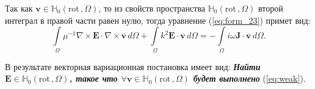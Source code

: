 \documentclass[a4paper,14pt]{article}
\begin{document}
Так как $\mathbf{v} \in \mathbb{H}_{0}( \mathrm{rot}\,, \Omega )$, то из свойств пространства $\mathbb{H}_{0}( \mathrm{rot}\,, \Omega )$ второй интеграл в правой части равен нулю, тогда уравнение (\ref{eq:form_23}) примет вид:
\begin{equation}
	\int\limits_\Omega \mu^{-1} \nabla \times \mathbf{E} \cdot \nabla \times \overline{\mathbf{v}} \,d\Omega + \int\limits_\Omega k^{2} \mathbf{E} \cdot \overline{\mathbf{v}} \,d\Omega = - \int\limits_\Omega i \omega \mathbf{J} \cdot \overline{\mathbf{v}} \,d\Omega . \label{eq:weak}
\end{equation}

В результате векторная вариационная постановка имеет вид: \textbf{\textit{Найти $\mathbf{E} \in \mathbb{H}_{0}( \mathrm{rot}\,, \Omega )$, такое что $\forall \mathbf{v} \in \mathbb{H}_{0}( \mathrm{rot}\,, \Omega )$ будет выполнено}} (\ref{eq:weak}).
\end{document}
